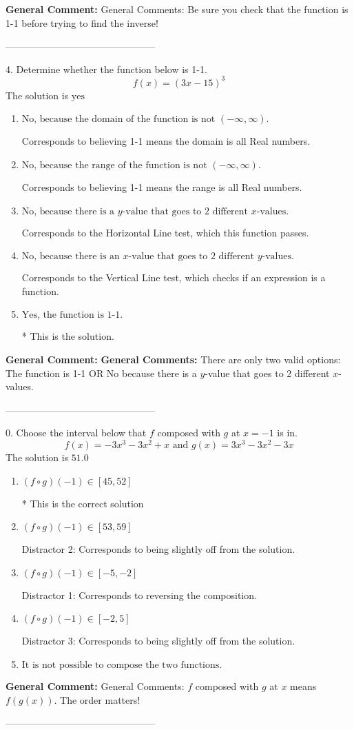 \documentclass{extbook}[14pt]
\begin{document}
\textbf{General Comment:} General Comments: Be sure you check that the function is 1-1 before trying to find the inverse! 

-----------------------------------------------

4. Determine whether the function below is 1-1.
\[ f(x) = (3 x - 15)^3 \] 
The solution is $ \text{yes} $ 

\begin{enumerate}[label=\Alph*.] 
\item $ \text{No, because the domain of the function is not $(-\infty, \infty)$.} $ 

 Corresponds to believing 1-1 means the domain is all Real numbers. 
\item $ \text{No, because the range of the function is not $(-\infty, \infty)$.} $ 

 Corresponds to believing 1-1 means the range is all Real numbers. 
\item $ \text{No, because there is a $y$-value that goes to 2 different $x$-values.} $ 

 Corresponds to the Horizontal Line test, which this function passes. 
\item $ \text{No, because there is an $x$-value that goes to 2 different $y$-values.} $ 

 Corresponds to the Vertical Line test, which checks if an expression is a function. 
\item $ \text{Yes, the function is 1-1.} $ 

 * This is the solution. 
\end{enumerate} 
 
\textbf{General Comment:} \textbf{General Comments:} There are only two valid options: The function is 1-1 OR No because there is a $y$-value that goes to 2 different $x$-values. 

-----------------------------------------------

0. Choose the interval below that $f$ composed with $g$ at $x=-1$ is in.
\[ f(x) = -3x^{3} -3 x^{2} +x \text{ and } g(x) = 3x^{3} -3 x^{2} -3 x \] 
The solution is $ 51.0 $ 

\begin{enumerate}[label=\Alph*.] 
\item $ (f \circ g)(-1) \in [45, 52] $ 

 * This is the correct solution 
\item $ (f \circ g)(-1) \in [53, 59] $ 

  Distractor 2: Corresponds to being slightly off from the solution. 
\item $ (f \circ g)(-1) \in [-5, -2] $ 

  Distractor 1: Corresponds to reversing the composition. 
\item $ (f \circ g)(-1) \in [-2, 5] $ 

  Distractor 3: Corresponds to being slightly off from the solution. 
\item $ \text{It is not possible to compose the two functions.} $ 

  
\end{enumerate} 
 
\textbf{General Comment:} General Comments: $f$ composed with $g$ at $x$ means $f(g(x))$. The order matters! 

-----------------------------------------------
\end{document}
